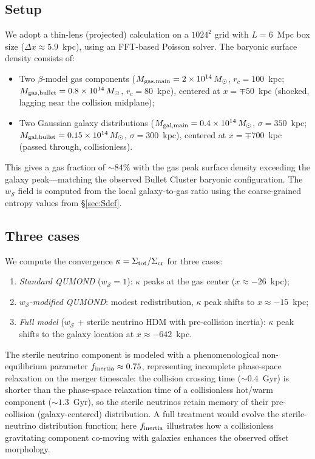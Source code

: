\documentclass[aps,prd,twocolumn,superscriptaddress,nofootinbib]{revtex4-2}
\newcommand{\wS}{w_{\mathcal{S}}}
\begin{document}
\subsection{Setup}

We adopt a thin-lens (projected) calculation on a $1024^2$ grid with $L=6$~Mpc box size ($\Delta x\approx 5.9$~kpc), using an FFT-based Poisson solver. The baryonic surface density consists of:
\begin{itemize}
\item Two $\beta$-model gas components ($M_{\rm gas,main}=2\times 10^{14}\,M_\odot$, $r_c=100$~kpc; $M_{\rm gas,bullet}=0.8\times 10^{14}\,M_\odot$, $r_c=80$~kpc), centered at $x=\mp 50$~kpc (shocked, lagging near the collision midplane);
\item Two Gaussian galaxy distributions ($M_{\rm gal,main}=0.4\times 10^{14}\,M_\odot$, $\sigma=350$~kpc; $M_{\rm gal,bullet}=0.15\times 10^{14}\,M_\odot$, $\sigma=300$~kpc), centered at $x=\mp 700$~kpc (passed through, collisionless).
\end{itemize}
This gives a gas fraction of $\sim 84\%$ with the gas peak surface density exceeding the galaxy peak---matching the observed Bullet Cluster baryonic configuration. The $\wS$ field is computed from the local galaxy-to-gas ratio using the coarse-grained entropy values from \S\ref{sec:Sdef}.

\subsection{Three cases}

We compute the convergence $\kappa=\Sigma_{\rm tot}/\Sigma_{\rm cr}$ for three cases:
\begin{enumerate}
\item \textit{Standard QUMOND} ($\wS=1$): $\kappa$ peaks at the gas center ($x\approx -26$~kpc);
\item \textit{$\wS$-modified QUMOND}: modest redistribution, $\kappa$ peak shifts to $x\approx -15$~kpc;
\item \textit{Full model} ($\wS$ + sterile neutrino HDM with pre-collision inertia): $\kappa$ peak shifts to the galaxy location at $x\approx -642$~kpc.
\end{enumerate}

The sterile neutrino component is modeled with a phenomenological non-equilibrium parameter $f_{\rm inertia}\approx 0.75$, representing incomplete phase-space relaxation on the merger timescale: the collision crossing time ($\sim 0.4$~Gyr) is shorter than the phase-space relaxation time of a collisionless hot/warm component ($\sim 1.3$~Gyr), so the sterile neutrinos retain memory of their pre-collision (galaxy-centered) distribution. A full treatment would evolve the sterile-neutrino distribution function; here $f_{\rm inertia}$ illustrates how a collisionless gravitating component co-moving with galaxies enhances the observed offset morphology.
\end{document}

